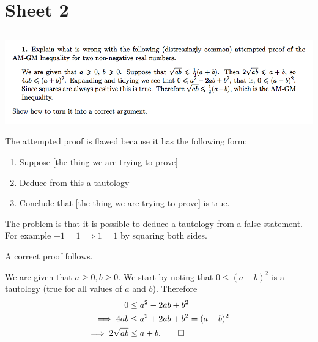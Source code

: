\documentclass[12pt]{article}
\begin{document}
\newpage
\section*{Sheet 2}
\subsection*{}
\includegraphics[width=450pt]{img/iulm-2-1.png}
\begin{mdframed}
  The attempted proof is flawed because it has the following form:
  \begin{enumerate}
  \item Suppose [the thing we are trying to prove]
  \item Deduce from this a tautology
  \item Conclude that [the thing we are trying to prove] is true.
  \end{enumerate}
  The problem is that it is possible to deduce a tautology from a false
  statement. For example $-1 = 1 \implies 1 = 1$ by squaring both sides.

  A correct proof follows.

  We are given that $a \geq 0, b \geq 0$. We start by noting that
  $0 \leq (a - b)^2$ is a tautology (true for all values of $a$ and
  $b$). Therefore
  \begin{align*}
              0 &\leq a^2 -2ab + b^2\\
    \implies  4ab &\leq a^2 + 2ab + b^2 = (a + b)^2\\
    \implies  2\sqrt{ab} &\leq a+b. \qed
  \end{align*}
\end{mdframed}
\end{document}
